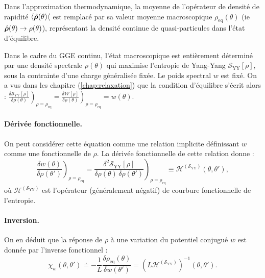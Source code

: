 Dans l’approximation thermodynamique, la moyenne de l’opérateur de densité de rapidité $ \langle \hat{\bm{\rho}}(\theta) \langle $ est remplacé par sa valeur moyenne macroscopique $\rho_{\mathrm{eq}}(\theta)$ (ie $\hat{\bm{\rho}}(\theta) \to \rho(\theta)$), représentant la densité continue de quasi-particules dans l’état d’équilibre.

Dans le cadre du GGE continu, l’état macroscopique est entièrement déterminé par une densité spectrale $\rho(\theta)$ qui maximise l’entropie de Yang-Yang $\mathcal{S}_{\mathrm{YY}}[\rho]$, sous la contrainte d’une charge généralisée fixée. Le poids spectral $w$ est fixé. On a vus dans les chapitre (\ref{chap:relaxation}) que la condition d’équilibre s’écrit alors :
\(
\left. \frac{\delta \mathcal{S}_{\mathrm{YY}}[\rho]}{\delta \rho(\theta)} \right)_{\rho = \rho_{\mathrm{eq}}} = \left. \frac{\delta \mathcal{W}[\rho]}{\delta \rho(\theta)} \right)_{\rho = \rho_{\mathrm{eq}}} =  w(\theta).
\)

\medskip
\paragraph{Dérivée fonctionnelle.}
On peut considérer cette équation comme une relation implicite définissant $w$ comme une fonctionnelle de $\rho$. La dérivée fonctionnelle de cette relation donne :
\[
\left.\frac{\delta w(\theta)}{\delta \rho(\theta')}\right)_{\rho = \rho_{\mathrm{eq}}} = \left. \frac{\delta^2 \mathcal{S}_{\mathrm{YY}}[\rho]}{\delta \rho(\theta)\, \delta \rho(\theta')} \right)_{\rho = \rho_{\mathrm{eq}}} \equiv \mathcal{H}^{(\mathcal{S}_{\mathrm{YY}})}(\theta, \theta'),
\]
où $\mathcal{H}^{(\mathcal{S}_{\mathrm{YY}})}$ est l'opérateur (généralement négatif) de courbure fonctionnelle de l'entropie.

\paragraph{Inversion.}
On en déduit que la réponse de $\rho$ à une variation du potentiel conjugué $w$ est donnée par l'inverse fonctionnel :
\[
\chi_w(\theta, \theta') \doteq -\frac{1}{L}\frac{\delta \rho_{\mathrm{eq}}(\theta)}{\delta w(\theta')} = \left( L \mathcal{H}^{(\mathcal{S}_{\mathrm{YY}})} \right)^{-1} (\theta, \theta').
\]




